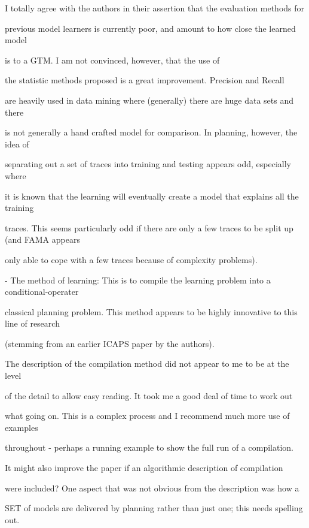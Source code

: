 \documentclass{article}
\begin{document}
\begin{mdframed}[hidealllines=true,backgroundcolor=gray!20]
  I totally agree with the authors in their assertion that the evaluation methods for 

previous model learners is currently poor, and amount to how close the learned model

is to a GTM. I am not convinced, however, that the use of

the statistic methods proposed is a great improvement. Precision and Recall

are heavily used in data mining where (generally) there are huge data sets and there 

is not generally a hand crafted model for comparison. In planning, however, the idea of 

separating out a set of traces into training and testing appears odd, especially where

it is known that the learning will eventually create a model that explains all the training

traces. This seems particularly odd if there are only a few traces to be split up (and FAMA appears 

only able to cope  with a few traces because of complexity problems).
\end{mdframed}

\begin{mdframed}[hidealllines=true,backgroundcolor=gray!20]
  - The method of learning: This is to compile the learning problem into a conditional-operater

classical planning problem. This method appears to be highly innovative to this line of research

(stemming from an earlier ICAPS paper by the authors). 

The description of the compilation method did not appear to me to be at the level

of the detail to allow easy reading. It took me a good deal of time to work out

what going on. This is a complex process and I recommend much more use of examples

throughout - perhaps a running example to show the full run of a compilation.

It might also improve the paper if an algorithmic description of compilation

were included? One aspect that was not obvious from the description was how a 

SET of models are delivered by planning rather than just one; this needs spelling out.
\end{mdframed}
\end{document}
